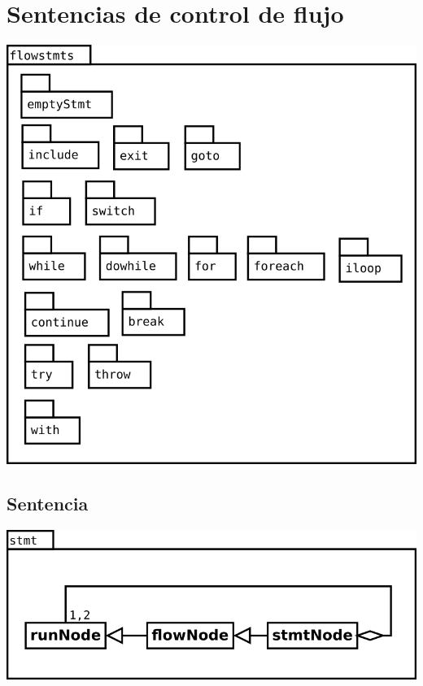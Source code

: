 \section{Sentencias de control de flujo}
\begin{center}
\includegraphics[scale=0.4]{flowstmts.png} \\
\end{center}

\subsection{Sentencia}
\begin{center}
\includegraphics[scale=0.4]{stmt.png} \\
\end{center}

